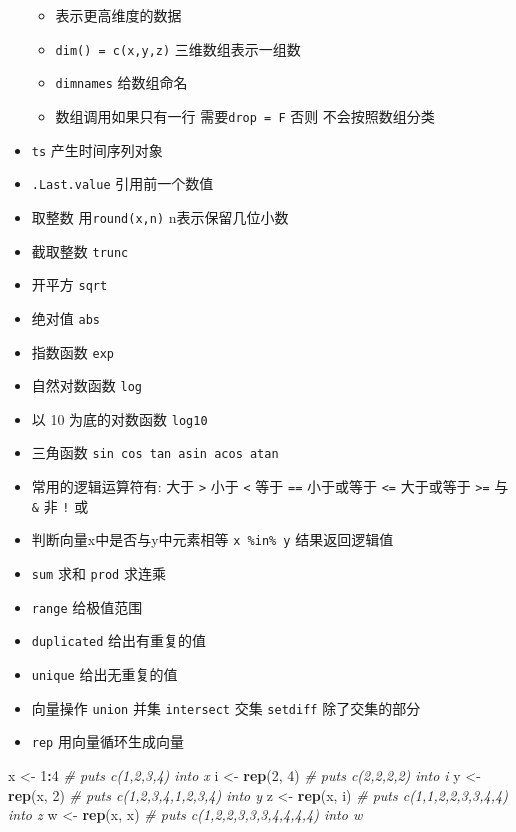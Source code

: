 \documentclass[]{book}
\newenvironment{Shaded}{\begin{snugshade}}{\end{snugshade}}
\newcommand{\CommentTok}[1]{\textcolor[rgb]{0.56,0.35,0.01}{\textit{#1}}}
\newcommand{\DecValTok}[1]{\textcolor[rgb]{0.00,0.00,0.81}{#1}}
\newcommand{\KeywordTok}[1]{\textcolor[rgb]{0.13,0.29,0.53}{\textbf{#1}}}
\newcommand{\NormalTok}[1]{#1}
\newcommand{\OperatorTok}[1]{\textcolor[rgb]{0.81,0.36,0.00}{\textbf{#1}}}
\newcommand{\StringTok}[1]{\textcolor[rgb]{0.31,0.60,0.02}{#1}}
\providecommand{\tightlist}{%
  \setlength{\itemsep}{0pt}\setlength{\parskip}{0pt}}
\begin{document}
\begin{itemize}
  \begin{itemize}
  \tightlist
  \item
    表示更高维度的数据
  \item
    \texttt{dim()\ =\ c(x,y,z)} 三维数组表示一组数
  \item
    \texttt{dimnames} 给数组命名
  \item
    数组调用如果只有一行 需要\texttt{drop\ =\ F} 否则 不会按照数组分类
  \end{itemize}
\item
  \texttt{ts} 产生时间序列对象
\item
  \texttt{.Last.value} 引用前一个数值
\item
  取整数 用\texttt{round(x,n)} n表示保留几位小数
\item
  截取整数 \texttt{trunc}
\item
  开平方 \texttt{sqrt}
\item
  绝对值 \texttt{abs}
\item
  指数函数 \texttt{exp}
\item
  自然对数函数 \texttt{log}
\item
  以 10 为底的对数函数 \texttt{log10}
\item
  三角函数 \texttt{sin\ cos\ tan\ asin\ acos\ atan}
\item
  常用的逻辑运算符有: 大于 \texttt{\textgreater{}} 小于 \texttt{\textless{}} 等于 \texttt{==} 小于或等于 \texttt{\textless{}=} 大于或等于 \texttt{\textgreater{}=} 与 \texttt{\&} 非 \texttt{!} 或\texttt{\textbar{}}
\item
  判断向量x中是否与y中元素相等 \texttt{x\ \%in\%\ y} 结果返回逻辑值
\item
  \texttt{sum} 求和 \texttt{prod} 求连乘
\item
  \texttt{range} 给极值范围
\item
  \texttt{duplicated} 给出有重复的值
\item
  \texttt{unique} 给出无重复的值
\item
  向量操作 \texttt{union} 并集 \texttt{intersect} 交集 \texttt{setdiff} 除了交集的部分
\item
  \texttt{rep} 用向量循环生成向量
\end{itemize}

\begin{Shaded}
\begin{Highlighting}[]
\NormalTok{x <-}\StringTok{ }\DecValTok{1}\OperatorTok{:}\DecValTok{4} \CommentTok{# puts c(1,2,3,4) into x}
\NormalTok{i <-}\StringTok{ }\KeywordTok{rep}\NormalTok{(}\DecValTok{2}\NormalTok{, }\DecValTok{4}\NormalTok{) }\CommentTok{# puts c(2,2,2,2) into i}
\NormalTok{y <-}\StringTok{ }\KeywordTok{rep}\NormalTok{(x, }\DecValTok{2}\NormalTok{) }\CommentTok{# puts c(1,2,3,4,1,2,3,4) into y}
\NormalTok{z <-}\StringTok{ }\KeywordTok{rep}\NormalTok{(x, i) }\CommentTok{# puts c(1,1,2,2,3,3,4,4) into z}
\NormalTok{w <-}\StringTok{ }\KeywordTok{rep}\NormalTok{(x, x) }\CommentTok{# puts c(1,2,2,3,3,3,4,4,4,4) into w}
\end{Highlighting}
\end{Shaded}
\end{document}
